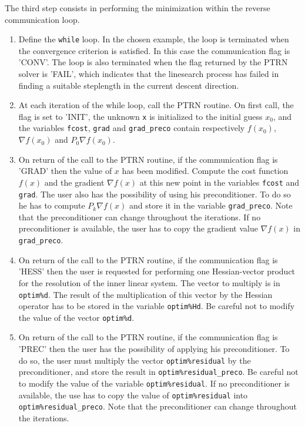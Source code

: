 \documentclass[a4paper,twoside,final,onecolumn,11pt,openright]{article}
\begin{document}
The third step consists in performing the minimization within the reverse communication loop. 
\begin{enumerate}
 \item Define the \texttt{while} loop. In the chosen example, the loop is terminated when the convergence criterion is satisfied. In this case the communication flag is 'CONV'. The loop is also terminated when the flag returned by the PTRN solver is 'FAIL', which indicates that the linesearch process has failed in finding a suitable steplength in the current descent direction. 
 \item At each iteration of the while loop, call the PTRN routine. On first call, the flag is set to 'INIT', the unknown \texttt{x} is initialized to the initial guess $x_0$, and the variables \texttt{fcost}, \texttt{grad} and \texttt{grad\_preco} contain respectively $f(x_0)$, $\nabla f(x_0)$ and $P_0\nabla f(x_0)$.
\item On return of the call to the PTRN routine, if the communication flag is 'GRAD' then the value of $x$ has been modified. Compute the cost function $f(x)$ and the gradient $\nabla f(x)$ at this new point in the variables \texttt{fcost} and \texttt{grad}. The user also has the possibility of using his preconditioner. To do so he has to compute $P_k\nabla f(x)$ and store it in the variable \texttt{grad\_preco}. Note that the preconditioner can change throughout the iterations. If no preconditioner is available, the user has to copy the gradient value $\nabla f(x)$ in \texttt{grad\_preco}. 
\item On return of the call to the PTRN routine, if the communication flag is 'HESS' then the user is requested for performing one Hessian-vector product for the resolution of the inner linear system. The vector to multiply is in \texttt{optim\%d}. The result of the multiplication of this vector by the Hessian operator has to be stored in the variable \texttt{optim\%Hd}. Be careful not to modify the value of the vector \texttt{optim\%d}.
\item On return of the call to the PTRN routine, if the communication flag is 'PREC' then the user has the possibility of applying his preconditioner. To do so, the user must multiply the vector \texttt{optim\%residual} by the preconditioner, and store the result in \texttt{optim\%residual\_preco}. Be careful not to modify the value of the variable \texttt{optim\%residual}. If no preconditioner is available, the use has to copy the value of \texttt{optim\%residual} into \texttt{optim\%residual\_preco}. Note that the preconditioner can change throughout the iterations. 
\end{enumerate}
\end{document}
